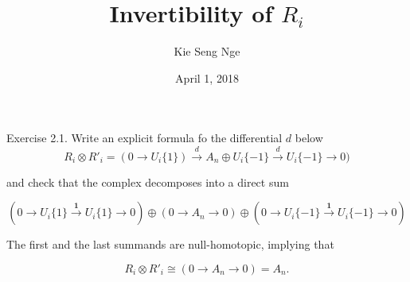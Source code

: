 \documentclass[psamsfonts,a4paper]{amsart}
\title{Invertibility of $R_i$}
\author{Kie Seng Nge}
\date{April 1, 2018}
\theoremstyle{plain}
\numberwithin{equation}{section}
\numberwithin{figure}{section}
\newcommand{\ra}{\rightarrow}
\newcommand{\xra}{\xrightarrow}
\newcommand{\ot}{\otimes}
\newcommand{\op}{\oplus}
\newcommand{\<}{\langle}
\renewcommand{\>}{\rangle}
\theoremstyle{named}
\theoremstyle{name}
\begin{document}
\maketitle

 Exercise 2.1. Write an explicit formula fo the differential $d$ below
\[
 R_i  \ot R'_i = (0 \ra U_i\{1\}) \xra{d} A_n \op U_i\{-1\} \xra{d} U_i\{-1\} \ra 0)
\]

and check that the complex decomposes into a direct sum

\[
(0 \ra U_i\{1\} \xra{\textbf{1}} U_i\{1\} \ra 0) \op (0 \ra A_n \ra 0)
\op (0 \ra U_i\{-1\} \xra{\textbf{1}} U_i\{-1\} \ra 0)
\]

The first and the last summands are null-homotopic, implying that 

\[
R_i  \ot R'_i \cong (0 \ra A_n \ra 0) = A_n.
\]
\end{document}
